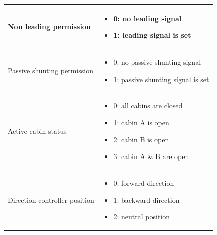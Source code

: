 \documentclass[nocc]{template/openetcs_report}
\begin{document}
\begin{longtable}{|l|l|}
				\hline
				\begin{minipage}[t]{0.5\linewidth} Non leading permission\end{minipage} 
				&	\begin{minipage}[t]{0.5\linewidth}
						\begin{itemize}
							\item 0: no leading signal
							\item 1: leading signal is set
						\end{itemize}
					\end{minipage} \\
				\hline
				\begin{minipage}[t]{0.5\linewidth} Passive shunting permission\end{minipage} 
				&	\begin{minipage}[t]{0.5\linewidth}
						\begin{itemize}
							\item 0: no passive shunting signal
							\item 1: passive shunting signal is set
						\end{itemize}
					\end{minipage} \\
				\hline
				\begin{minipage}[t]{0.5\linewidth} Active cabin status	\end{minipage} 
				&	\begin{minipage}[t]{0.5\linewidth}
						\begin{itemize}
							\item 0: all cabins are closed
							\item 1: cabin A is open
							\item 2: cabin B is open
							\item 3: cabin A \& B are open
						\end{itemize}
					\end{minipage} \\
				\hline
				\begin{minipage}[t]{0.5\linewidth} Direction controller position	\end{minipage} 
				&	\begin{minipage}[t]{0.5\linewidth}
						\begin{itemize}
							\item 0: forward direction
							\item 1: backward direction
							\item 2: neutral position
						\end{itemize}

\end{minipage}
\end{longtable}
\end{document}
